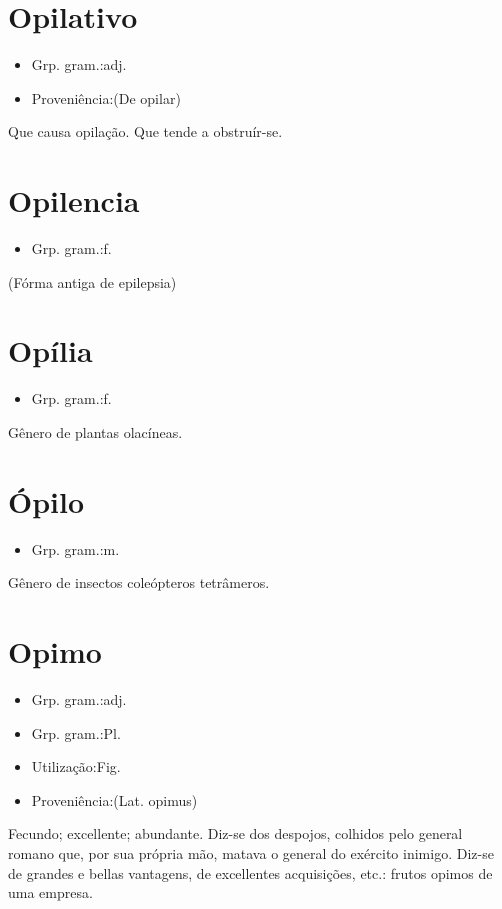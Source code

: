 \section{Opilativo}
\begin{itemize}
\item {Grp. gram.:adj.}
\end{itemize}
\begin{itemize}
\item {Proveniência:(De \textunderscore opilar\textunderscore )}
\end{itemize}
Que causa opilação.
Que tende a obstruír-se.
\section{Opilencia}
\begin{itemize}
\item {Grp. gram.:f.}
\end{itemize}
(Fórma antiga de \textunderscore epilepsia\textunderscore )
\section{Opília}
\begin{itemize}
\item {Grp. gram.:f.}
\end{itemize}
Gênero de plantas olacíneas.
\section{Ópilo}
\begin{itemize}
\item {Grp. gram.:m.}
\end{itemize}
Gênero de insectos coleópteros tetrâmeros.
\section{Opimo}
\begin{itemize}
\item {Grp. gram.:adj.}
\end{itemize}
\begin{itemize}
\item {Grp. gram.:Pl.}
\end{itemize}
\begin{itemize}
\item {Utilização:Fig.}
\end{itemize}
\begin{itemize}
\item {Proveniência:(Lat. \textunderscore opimus\textunderscore )}
\end{itemize}
Fecundo; excellente; abundante.
Diz-se dos despojos, colhidos pelo general romano que, por sua própria mão, matava o general do exército inimigo.
Diz-se de grandes e bellas vantagens, de excellentes acquisições, etc.: \textunderscore frutos opimos de uma empresa\textunderscore .
